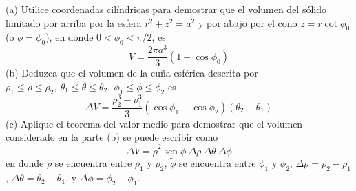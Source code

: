 \item (a) Utilice coordenadas cilíndricas para demostrar que el volumen del sólido limitado por arriba por la esfera $r^2 + z^2 = a^2$ y por abajo por el cono $z = r \cot \phi_0$ (o $\phi = \phi_0$), en donde $0 < \phi_0 < \pi/2$, es
\[ V = \frac{2\pi a^3}{3}(1 - \cos \phi_0) \]
(b) Deduzca que el volumen de la cuña esférica descrita por $\rho_1 \le \rho \le \rho_2, \ \theta_1 \le \theta \le \theta_2, \ \phi_1 \le \phi \le \phi_2$ es
\[ \Delta V = \frac{\rho_2^3 - \rho_1^3}{3} (\cos \phi_1 - \cos \phi_2)(\theta_2 - \theta_1) \]
(c) Aplique el teorema del valor medio para demostrar que el volumen considerado en la parte (b) se puede escribir como
\[ \Delta V = \tilde{\rho}^2 \operatorname{sen} \tilde{\phi} \ \Delta\rho \ \Delta\theta \ \Delta\phi \]
en donde $\tilde{\rho}$ se encuentra entre $\rho_1$ y $\rho_2$, $\tilde{\phi}$ se encuentra entre $\phi_1$ y $\phi_2$, $\Delta\rho = \rho_2 - \rho_1$, $\Delta\theta = \theta_2 - \theta_1$, y $\Delta\phi = \phi_2 - \phi_1$.

